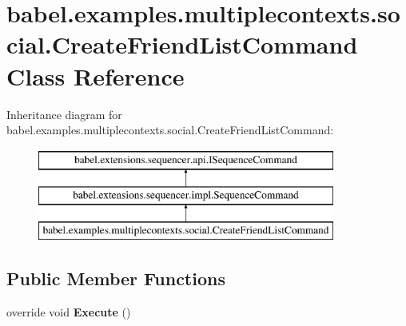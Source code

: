 \hypertarget{classbabel_1_1examples_1_1multiplecontexts_1_1social_1_1_create_friend_list_command}{\section{babel.\-examples.\-multiplecontexts.\-social.\-Create\-Friend\-List\-Command Class Reference}
\label{classbabel_1_1examples_1_1multiplecontexts_1_1social_1_1_create_friend_list_command}
}
Inheritance diagram for babel.\-examples.\-multiplecontexts.\-social.\-Create\-Friend\-List\-Command\-:\begin{figure}[H]
\begin{center}
\leavevmode
\includegraphics[height=3.000000cm]{classbabel_1_1examples_1_1multiplecontexts_1_1social_1_1_create_friend_list_command}
\end{center}
\end{figure}
\subsection*{Public Member Functions}
\begin{DoxyCompactItemize}
\item 
\hypertarget{classbabel_1_1examples_1_1multiplecontexts_1_1social_1_1_create_friend_list_command_a6289c2336b94bf03353f49e62276fe7e}{override void {\bfseries Execute} ()}\label{classbabel_1_1examples_1_1multiplecontexts_1_1social_1_1_create_friend_list_command_a6289c2336b94bf03353f49e62276fe7e}

\end{DoxyCompactItemize}

